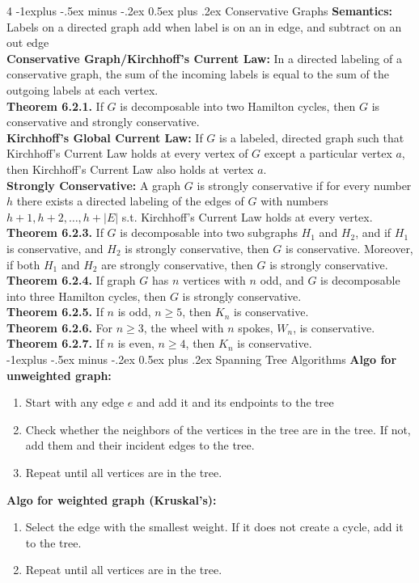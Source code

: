 \documentclass[letterpaper, 8pt]{extarticle}
\makeatletter
\renewcommand{\section}{\@startsection{section}{1}{0mm}%
	{-1explus -.5ex minus -.2ex}%
	{0.5ex plus .2ex}%
	{\normalfont\normalsize\bfseries}}
\makeatother
\begin{document}
\begin{multicols*}{4}
	\section{Conservative Graphs}
	\textbf{Semantics:} Labels on a directed graph add when label is on an in edge, and subtract on an out edge \\
	\textbf{Conservative Graph/Kirchhoff's Current Law:} In a directed labeling of a conservative graph, the sum of the incoming labels is equal to the sum of the outgoing labels at each vertex. \\
	\textbf{Theorem 6.2.1.} If $G$ is decomposable into two Hamilton cycles, then $G$ is conservative and strongly conservative. \\
	\textbf{Kirchhoff's Global Current Law:} If $G$ is a labeled, directed graph such that Kirchhoff's Current Law holds at every vertex of $G$ except a particular vertex $a$, then Kirchhoff's Current Law also holds at vertex $a$. \\
	\textbf{Strongly Conservative:} A graph $G$ is strongly conservative if for every number $h$ there exists a directed labeling of the edges of $G$ with numbers $h+1, h+2, \dots, h+|E|$ s.t. Kirchhoff's Current Law holds at every vertex. \\
	\textbf{Theorem 6.2.3.} If $G$ is decomposable into two subgraphs $H_1$ and $H_2$, and if $H_1$ is conservative, and $H_2$ is strongly conservative, then $G$ is conservative. Moreover, if both $H_1$ and $H_2$ are strongly conservative, then $G$ is strongly conservative. \\
	\textbf{Theorem 6.2.4.} If graph $G$ has $n$ vertices with $n$ odd, and $G$ is decomposable into three Hamilton cycles, then $G$ is strongly conservative. \\
	\textbf{Theorem 6.2.5.} If $n$ is odd, $n \ge 5$, then $K_n$ is conservative. \\
	\textbf{Theorem 6.2.6.} For $n \ge 3$, the wheel with $n$ spokes, $W_n$, is conservative. \\
	\textbf{Theorem 6.2.7.} If $n$ is even, $n \ge 4$, then $K_n$ is conservative. \\

	\section{Spanning Tree Algorithms}
	\textbf{Algo for unweighted graph:}
	\begin{enumerate}
		\item Start with any edge $e$ and add it and its endpoints to the tree
		\item Check whether the neighbors of the vertices in the tree are in the tree. If not, add them and their incident edges to the tree.
		\item Repeat until all vertices are in the tree.
	\end{enumerate}
	\textbf{Algo for weighted graph (Kruskal's):}
	\begin{enumerate}
		\item Select the edge with the smallest weight. If it does not create a cycle, add it to the tree.
		\item Repeat until all vertices are in the tree.
	\end{enumerate}

\end{multicols*}
\end{document}
